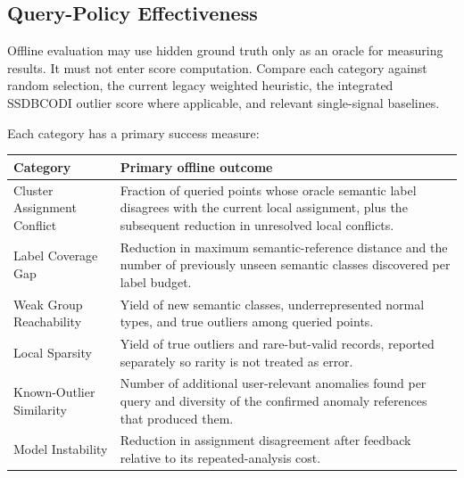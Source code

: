 \documentclass[11pt]{article}
\begin{document}
\subsection{Query-Policy Effectiveness}

Offline evaluation may use hidden ground truth only as an oracle for measuring
results. It must not enter score computation. Compare each category against
random selection, the current legacy weighted heuristic, the integrated
SSDBCODI outlier score where applicable, and relevant single-signal baselines.

Each category has a primary success measure:
\begin{table}[h]
\centering
\small
\begin{tabularx}{\textwidth}{p{} X}
\toprule
Category & Primary offline outcome \\
\midrule
Cluster Assignment Conflict & Fraction of queried points whose oracle semantic
label disagrees with the current local assignment, plus the subsequent reduction
in unresolved local conflicts. \\

Label Coverage Gap & Reduction in maximum semantic-reference distance and the
number of previously unseen semantic classes discovered per label budget. \\

Weak Group Reachability & Yield of new semantic classes, underrepresented normal
types, and true outliers among queried points. \\

Local Sparsity & Yield of true outliers and rare-but-valid records, reported
separately so rarity is not treated as error. \\

Known-Outlier Similarity & Number of additional user-relevant anomalies found
per query and diversity of the confirmed anomaly references that produced them. \\

Model Instability & Reduction in assignment disagreement after feedback relative
to its repeated-analysis cost. \\
\bottomrule
\end{tabularx}
\end{table}
\end{document}
